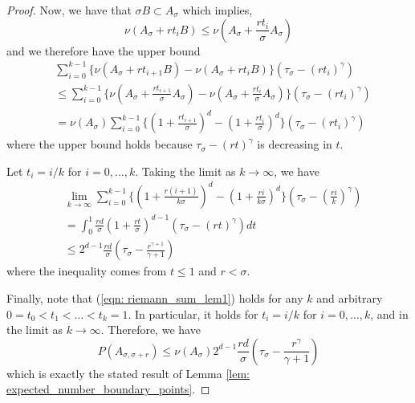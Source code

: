 \documentclass{article}
\newcommand{\Asig}{A_{\sigma}}
\newcommand{\1}{\mathbf{1}}
\theoremstyle{aldenthm}
\begin{document}
\begin{proof}
	Now, we have that $\sigma B \subset \Asig$  which implies, 
	\begin{equation*}
	\nu(\Asig + rt_iB) \leq \nu(\Asig + \frac{r t_i}{\sigma} \Asig)
	\end{equation*}
	and we therefore have the upper bound
	\begin{align}
	\label{eqn: riemann_sum_lem1}
	& \sum_{i = 0}^{k-1} \biggl\{\nu(\Asig + rt_{i+1}B) - \nu(\Asig + rt_iB)\biggr\} \left(\tau_{\sigma} - (rt_i)^{\gamma}\right) \nonumber \\
	& \leq \sum_{i = 0}^{k-1} \biggl\{\nu(\Asig + \frac{r t_{i+1}}{\sigma} \Asig) - \nu(\Asig + \frac{r t_i}{\sigma} \Asig)\biggr\} \left(\tau_{\sigma} - (rt_i)^{\gamma}\right) \nonumber \\
	& = \nu(\Asig) \sum_{i = 0}^{k-1} \biggl\{ (1 + \frac{r t_{i+1}}{\sigma})^d - (1 + \frac{r t_{i}}{\sigma})^d \biggr\} \left(\tau_{\sigma} - (rt_i)^{\gamma}\right) 
	\end{align}
	where the upper bound holds because $\tau_{\sigma} - (rt)^{\gamma}$ is decreasing in $t$.
	
	Let $t_{i} = i/k$ for $i = 0, \ldots, k$. Taking the limit as $k \to \infty$, we have
	\begin{align*}
	& \lim_{k \to \infty} \sum_{i = 0}^{k-1} \biggl\{ \left(1 + \frac{r (i+1)}{k\sigma}\right)^d - \left(1 + \frac{r i}{k\sigma}\right)^d \biggr\} \left(\tau_{\sigma} - \left(\frac{ri}{k}\right)^{\gamma}\right)  \\
	 & = \int_{0}^{1} \frac{rd}{\sigma} (1 + \frac{r t}{\sigma})^{d-1} (\tau_{\sigma} - (rt)^{\gamma}) dt \\
	& \leq 2^{d-1} \frac{rd}{\sigma} \left(\tau_{\sigma} - \frac{r^{\gamma + 1}}{\gamma + 1}\right)
	\end{align*}
	where the inequality comes from $t \leq 1$ and $r < \sigma$. 
	
	Finally, note that (\ref{eqn: riemann_sum_lem1}) holds for any $k$ and arbitrary $0 = t_0 < t_1 < \ldots < t_k = 1$. In particular, it holds for $t_{i} = i/k$ for $i = 0, \ldots, k$, and in the limit as $k \to \infty$. Therefore, we have
	\begin{equation*}
	P(A_{\sigma, \sigma + r}) \leq \nu(\Asig) 2^{d-1} \frac{rd}{\sigma}  \left(\tau_{\sigma} - \frac{r^{\gamma}}{\gamma + 1}\right)
	\end{equation*}
	which is exactly the stated result of Lemma \ref{lem: expected_number_boundary_points}.
\end{proof}
\end{document}
